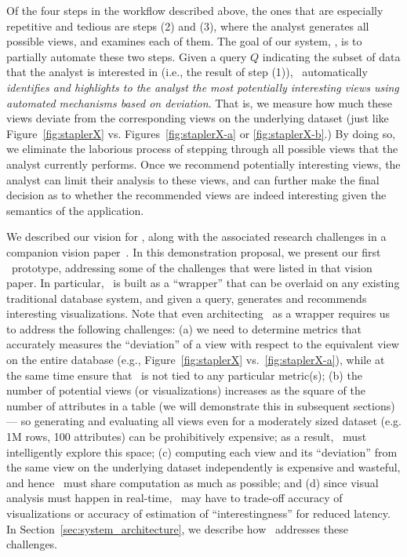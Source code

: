 Of the four steps in the workflow described above, the 
ones that are especially repetitive and tedious are steps (2) and (3),
where the analyst generates all possible views, and examines each of them.
The goal of our system, \SeeDB, is to partially automate these two steps.
Given a query $Q$ indicating the subset of data that the analyst is interested in
(i.e., the result of step (1)), 
\SeeDB\ automatically {\em identifies and highlights to the analyst 
the most potentially interesting views using automated mechanisms 
based on deviation}.
That is, we measure how much these views deviate from the corresponding
views on the underlying dataset 
(just like Figure~\ref{fig:staplerX} vs. Figures~\ref{fig:staplerX-a} or \ref{fig:staplerX-b}.)
By doing so, we eliminate the laborious process
of stepping through all possible views that the analyst currently 
performs.
Once we recommend potentially interesting views, the analyst can 
limit their analysis to these views, and can further
make the final decision as to whether the recommended views are indeed interesting
given the semantics of the application.

We described our vision for \SeeDB, along with the associated research challenges
in a companion vision paper~\cite{DBLP:conf/vldb/Parameswaran2013}. 
In this demonstration proposal, we present our first \SeeDB\ prototype,
addressing some of the challenges that were listed in that vision paper.
In particular, \SeeDB\ is built as a ``wrapper'' that can be overlaid on
any existing traditional database system, and given a query, 
generates and recommends interesting visualizations.
Note that even architecting \SeeDB\ as a wrapper requires us to 
address the following challenges:
(a) we need to determine metrics that accurately measures the
``deviation'' of a view with respect to the equivalent view
on the entire database (e.g., Figure~\ref{fig:staplerX}
vs.~\ref{fig:staplerX-a}), while at the same time
ensure that \SeeDB\ is not tied to any particular metric(s);
(b) the number of potential views (or visualizations) increases 
as the square of the number of attributes in a table 
(we will demonstrate this in subsequent sections) --- so generating 
and evaluating all views even for a moderately sized dataset
(e.g. 1M rows, 100 attributes) can be prohibitively expensive; 
as a result, \SeeDB\ must intelligently
explore this space; 
(c) computing each view and its ``deviation'' from 
the same view on the underlying dataset independently is
expensive and wasteful, and hence \SeeDB\ must share computation as much as possible; and 
(d) since visual analysis must happen in real-time, \SeeDB\ may have to
trade-off accuracy of visualizations or accuracy of estimation of ``interestingness'' 
for reduced latency. In Section~\ref{sec:system_architecture}, 
we describe how \SeeDB\ addresses these challenges.




